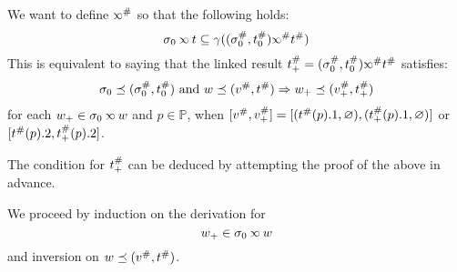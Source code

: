 We want to define $\Abs\semlink$ so that the following holds:
\[\ctx_0\semlink\ptree\subseteq\gamma((\Abs{\ctx}_0,\Abs{\ptree}_0)\Abs\semlink\Abs\ptree)\]
This is equivalent to saying that the linked result $\Abs\ptree_+=(\Abs\ctx_0,\Abs\ptree_0)\Abs\semlink\Abs\ptree$ satisfies:
\[\sigma_0\preceq({\sigma}^{\#}_0,{t}^{\#}_0)\textnormal{ and }w\preceq({v}^{\#},{t}^{\#})\Rightarrow w_+\preceq({v}^{\#}_+,{t}^{\#}_+)\]
for each $w_+\in\ctx_0\semlink w$ and $p\in\mathbb{P}$,
when $[{v}^{\#},{v}^{\#}_+] = [({t}^{\#}(p).1,\varnothing),({t}^{\#}_+(p).1,\varnothing)]$ or $[{t}^{\#}(p).2,{t}^{\#}_+(p).2]$.

The condition for ${t}^{\#}_+$ can be deduced by attempting the proof of the above in advance.

We proceed by induction on the derivation for
\[w_+\in\ctx_0\semlink w\]
and inversion on $w\preceq({v}^{\#},{t}^{\#})$.
